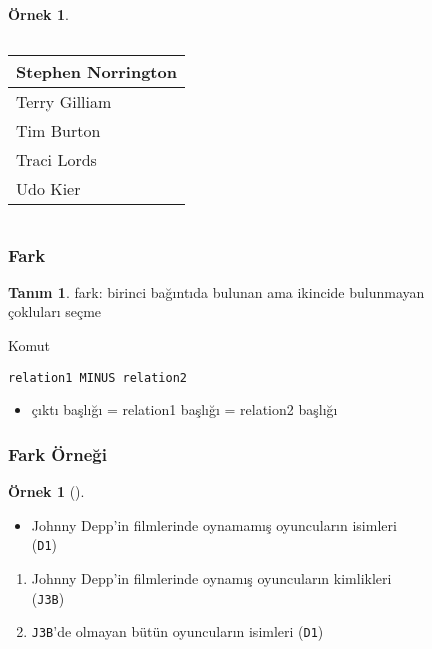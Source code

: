 \documentclass[dvipsnames]{beamer}
\theoremstyle{definition}
\newtheorem{tanim}[theorem]{Tanım}
\theoremstyle{example}
\newtheorem{ornek}[theorem]{Örnek}
\theoremstyle{plain}
\begin{document}
\begin{frame}[fragile]
\begin{ornek}
\begin{columns}[b]
      \begin{tiny}
      \begin{table}
        \begin{tabular}{|l|}\hline
Stephen Norrington   \\\hline
Terry Gilliam        \\\hline
Tim Burton           \\\hline
Traci Lords          \\\hline
Udo Kier             \\\hline
        \end{tabular}
      \end{table}
      \end{tiny}
    \end{columns}
  \end{ornek}
\end{frame}

\begin{frame}[fragile]
  \frametitle{Fark}

  \begin{tanim}
    \alert{fark}: birinci bağıntıda bulunan ama ikincide bulunmayan\\
      çokluları seçme
  \end{tanim}

  \pause
  \begin{block}{Komut}
    \begin{lstlisting}
relation1 MINUS relation2
    \end{lstlisting}
  \end{block}

  \pause
  \begin{itemize}
    \item çıktı başlığı = relation1 başlığı = relation2 başlığı
  \end{itemize}
\end{frame}

\begin{frame}
  \frametitle{Fark Örneği}

  \begin{ornek}[]
    \begin{itemize}
      \item Johnny Depp'in filmlerinde oynamamış oyuncuların isimleri\\
        (\texttt{D1})
    \end{itemize}

    \pause
    \begin{enumerate}
      \item Johnny Depp'in filmlerinde oynamış oyuncuların kimlikleri\\
        (\texttt{J3B})

      \pause
      \item \texttt{J3B}'de olmayan bütün oyuncuların isimleri (\texttt{D1})
    \end{enumerate}
  \end{ornek}
\end{frame}
\end{document}

